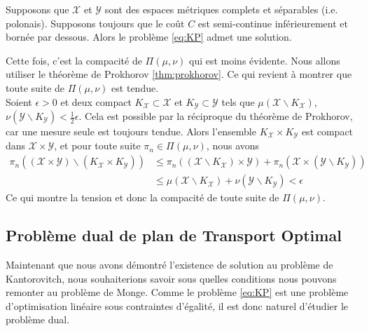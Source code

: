 \documentclass[a4paper,12pt]{article}
\begin{document}
\begin{proposition}
Supposons que $\mathcal{X}$ et $\mathcal{Y}$ sont des espaces métriques complets et séparables (i.e. polonais). Supposons toujours que le coût $C$ est semi-continue inférieurement et bornée par dessous. Alors le problème \eqref{eq:KP} admet une solution. 
\end{proposition}
\begin{preuve}
Cette fois, c'est la compacité de $\Pi(\mu,\nu)$ qui est moins évidente. Nous allons utiliser le théorème de Prokhorov \eqref{thm:prokhorov}. Ce qui revient à montrer que toute suite de $\Pi (\mu,\nu)$ est tendue. \\
Soient $\epsilon >0$ et deux compact $K_{\mathcal{X}}\subset\mathcal{X}$ et $K_{\mathcal{Y}}\subset \mathcal{Y}$ tels que $\mu (\mathcal{X}\backslash K_{\mathcal{X}})$, $\nu (\mathcal{Y} \backslash K_{\mathcal{Y}}) < \frac{1}{2}\epsilon$. Cela est possible par la réciproque du théorème de Prokhorov, car une mesure seule est toujours tendue. 
Alors l'ensemble $K_{\mathcal{X}}\times K_{\mathcal{Y}}$ est compact dans $\mathcal{X}\times\mathcal{Y}$, et pour toute suite $\pi_n\in\Pi (\mu,\nu )$, nous avons 
\begin{align*}
\pi_n\left((\mathcal{X}\times\mathcal{Y})\backslash (K_{\mathcal{X}}\times K_{\mathcal{Y}}) \right) &\leq \pi_n((\mathcal{X}\backslash K_{\mathcal{X}})\times \mathcal{Y}) + \pi_n(\mathcal{X}\times (\mathcal{Y}\backslash K_{\mathcal{Y}}))\\
&\leq \mu (\mathcal{X} \backslash K_{\mathcal{X}}) + \nu (\mathcal{Y}\backslash K_{\mathcal{Y}}) < \epsilon
\end{align*}
Ce qui montre la tension et donc la compacité de toute suite de $\Pi (\mu,\nu )$. 
\end{preuve}

\subsection{Problème dual de plan de Transport Optimal}
Maintenant que nous avons démontré l'existence de solution au problème de Kantorovitch, nous souhaiterions savoir sous quelles conditions nous pouvons remonter au problème de Monge. Comme le problème \eqref{eq:KP} est une problème d'optimisation linéaire sous contraintes d'égalité, il est donc naturel d'étudier le problème dual. \\
\end{document}
